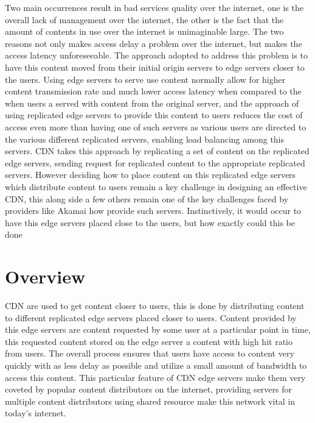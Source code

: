 Two main occurrences result in bad services quality over the internet, one is the overall lack of management over the internet, the other is the fact that the amount of contents in use over the internet is unimaginable large. The two reasons not only makes access delay a problem over the internet, but  makes the access latency unforeseeable. The approach adopted to address this problem is to have this content moved from their initial origin servers to edge servers closer to the users. Using edge servers to serve use content normally allow for higher content transmission rate and much lower access latency when compared to the when users a served with content from the original server, and the approach of using replicated edge servers to provide this content to users reduces the cost of access even more than having one of such servers as various users are directed to the various different replicated servers, enabling load balancing among this servers. CDN takes this approach by replicating a set of content on the replicated edge servers, sending request for replicated content to the appropriate replicated servers. However deciding how to place content on this 
 replicated edge servers which distribute content to users remain a key challenge in designing an effective CDN, this along side a few others remain one of the key challenges faced by providers like Akamai how provide such servers. Instinctively, it would occur to have this edge servers placed close to the users, but how exactly could this be done

\section{Overview}
CDN are used to get content closer to users, this is done by distributing content to different replicated edge servers placed closer to users. Content provided by this edge servers are content requested by some user at a particular point in time, this requested content stored on the edge server a content with high hit ratio from users.  The overall process ensures that users have access to content very quickly with as less delay as possible and utilize a small amount of bandwidth to access this content.  This particular feature of CDN edge servers make them very coveted by popular content distributors on the internet, providing servers for multiple content distributors using shared resource make this network vital in today's internet. 

